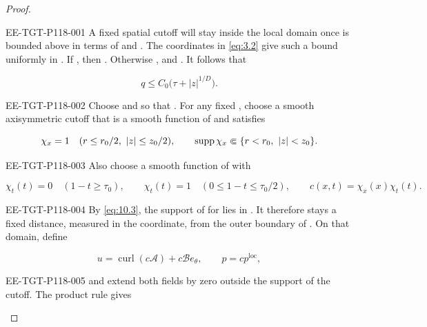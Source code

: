 \begin{proof}
\begin{EESegment}{EE-TGT-P118-001}
A fixed spatial cutoff will stay inside the local domain once  is bounded
above in terms of  and . The coordinates in
\eqref{eq:3.2} give such a bound uniformly in . If
, then . Otherwise
, and
. It follows that
\end{EESegment}
\begin{equation}
q\leq C_0\bigl(\tau+|z|^{1/D}\bigr).
\tag{10.3}\label{eq:10.3}
\end{equation}
\begin{EESegment}{EE-TGT-P118-002}
Choose  and  so that
. For any fixed
, choose a smooth axisymmetric cutoff
 that is a smooth function of
 and satisfies
\end{EESegment}
\[
\chi_x=1\quad(r\leq r_0/2,\ |z|\leq z_0/2),
\qquad \operatorname{supp}\chi_x\Subset\{r<r_0,\ |z|<z_0\}.
\]
\begin{EESegment}{EE-TGT-P118-003}
Also choose a smooth function  of
 with
\end{EESegment}
\[
\chi_t(t)=0\quad(1-t\geq\tau_0),
\qquad \chi_t(t)=1\quad(0\leq1-t\leq\tau_0/2),
\qquad c(x,t)=\chi_x(x)\chi_t(t).
\]
\begin{EESegment}{EE-TGT-P118-004}
By \eqref{eq:10.3}, the support of  for
 lies in . It therefore stays a fixed
distance, measured in the  coordinate, from the outer boundary of
. On that domain, define
\end{EESegment}
\begin{equation}
u=\operatorname{curl}(c\mathcal A)+c\mathcal Be_\theta,
\qquad p=cp^{\mathrm{loc}},
\tag{10.4}\label{eq:10.4}
\end{equation}
\begin{EESegment}{EE-TGT-P118-005}
and extend both fields by zero outside the support of the cutoff. The product rule gives

\end{EESegment}
\end{proof}
